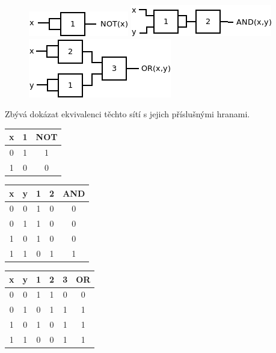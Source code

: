 \documentclass{scrartcl}
\begin{document}
\begin{figure}[!htb]
      \includegraphics[width=\linewidth]{nand_to_not}
    \endminipage\hfill
      \includegraphics[width=\linewidth]{nand_to_and}
    \endminipage\hfill
      \includegraphics[width=\linewidth]{nand_to_or}
    \endminipage
\end{figure}

Zbývá dokázat ekvivalenci těchto sítí s jejich příslušnými hranami.

\begin{center}
    \begin{tabular}{c | c | c}
        x & 1 & NOT \\ \hline
        0 & 1 & 1   \\
        1 & 0 & 0         
    \end{tabular}
    \hspace{5pt}
    \begin{tabular}{c | c | c | c | c}
        x & y & 1 & 2 & AND \\ \hline
        0 & 0 & 1 & 0 & 0   \\
        0 & 1 & 1 & 0 & 0   \\
        1 & 0 & 1 & 0 & 0   \\
        1 & 1 & 0 & 1 & 1   
    \end{tabular}
    \hspace{5pt}
    \begin{tabular}{c | c | c | c | c | c}
        x & y & 1 & 2 & 3 & OR  \\ \hline
        0 & 0 & 1 & 1 & 0 & 0   \\
        0 & 1 & 0 & 1 & 1 & 1   \\
        1 & 0 & 1 & 0 & 1 & 1   \\
        1 & 1 & 0 & 0 & 1 & 1
    \end{tabular}
\end{center}
\end{document}
